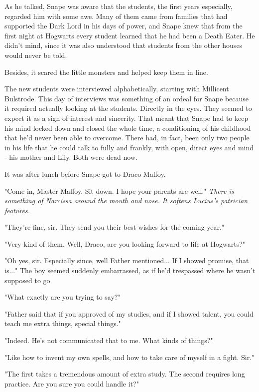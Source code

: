 As he talked, Snape was aware that the students, the first years especially, regarded him with some awe. Many of them came from families that had supported the Dark Lord in his days of power, and Snape knew that from the first night at Hogwarts every student learned that he had been a Death Eater. He didn't mind, since it was also understood that students from the other houses would never be told.

Besides, it scared the little monsters and helped keep them in line.

The new students were interviewed alphabetically, starting with Millicent Bulstrode. This day of interviews was something of an ordeal for Snape because it required actually looking at the students. Directly in the eyes. They seemed to expect it as a sign of interest and sincerity. That meant that Snape had to keep his mind locked down and closed the whole time, a conditioning of his childhood that he'd never been able to overcome. There had, in fact, been only two people in his life that he could talk to fully and frankly, with open, direct eyes and mind - his mother and Lily. Both were dead now.

It was after lunch before Snape got to Draco Malfoy.

"Come in, Master Malfoy. Sit down. I hope your parents are well." \emph{There is something of Narcissa around the mouth and nose. It softens Lucius's patrician features.}

"They're fine, sir. They send you their best wishes for the coming year."

"Very kind of them. Well, Draco, are you looking forward to life at Hogwarts?"

"Oh yes, sir. Especially since, well Father mentioned... If I showed promise, that is..." The boy seemed suddenly embarrassed, as if he'd trespassed where he wasn't supposed to go.

"What exactly are you trying to say?"

"Father said that if you approved of my studies, and if I showed talent, you could teach me extra things, special things."

"Indeed. He's not communicated that to me. What kinds of things?"

"Like how to invent my own spells, and how to take care of myself in a fight. Sir."

"The first takes a tremendous amount of extra study. The second requires long practice. Are you sure you could handle it?"

